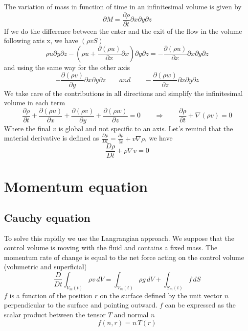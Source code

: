 			The variation of mass in function of time in an infinitesimal volume is given by 
			\begin{equation}
				\partial M = \frac{\partial \rho}{\partial t} \partial x \partial y \partial z
			\end{equation}
			If we do the difference between the enter and the exit of the flow in the volume following axis x, we have $(\rho v S)$
			\begin{equation}
				\rho u \partial y \partial z - \left( \rho u + \frac{\partial (\rho u)}{\partial x}\partial x \right) \partial y \partial z
				= - \frac{\partial (\rho u)}{\partial x}\partial x \partial y \partial z
			\end{equation}
			and using the same way for the other axis
			\begin{equation}
				- \frac{\partial (\rho v)}{\partial y}\partial x \partial y \partial z
				 \qquad and \qquad 
				- \frac{\partial (\rho w)}{\partial z}\partial x \partial y \partial z
			\end{equation}
			We take care of the contributions in all directions and simplify the infinitesimal volume in each term
			\begin{equation}
				\frac{\partial \rho}{\partial t} + \frac{\partial (\rho u)}{\partial x} + \frac{\partial (\rho v)}{\partial y} + \frac{\partial (\rho w)}{\partial z} = 0 
				\qquad \Rightarrow \qquad
				\frac{\partial \rho}{\partial t} + \nabla (\rho v) = 0
			\end{equation}
			Where the final $v$ is global and not specific to an axis. Let's remind that the material derivative is defined as $\frac{D\rho}{Dt} = \frac{\partial \rho}{\partial t} + v \nabla \rho$, we have
			\begin{equation}
				\frac{D\rho}{Dt} + \rho \nabla v = 0
			\end{equation}
			
\section{Momentum equation}
\subsection{Cauchy equation}
	To solve this rapidly we use the Langrangian approach. We suppose that the control volume is moving with the fluid and contains a fixed mass. The momentum rate of change is equal to the net force acting on the control volume (volumetric and superficial)
	\begin{equation}
		\frac{D}{Dt} \int _{V_m(t)} \rho v \, dV = \int _{V_m(t)} \rho g \, dV + \int _{S_m(t)} f \, dS
		\label{eq:2.18}
	\end{equation}
	$f$ is a function of the position $r$ on the surface defined by the unit vector $n$ perpendicular to the surface and pointing outward. $f$ can be expressed as the scalar product between the tensor $T$ and normal $n$
	\begin{equation}
		f(n,r) = n\,T(r)
		\label{eq:2.19}
	\end{equation}
	
